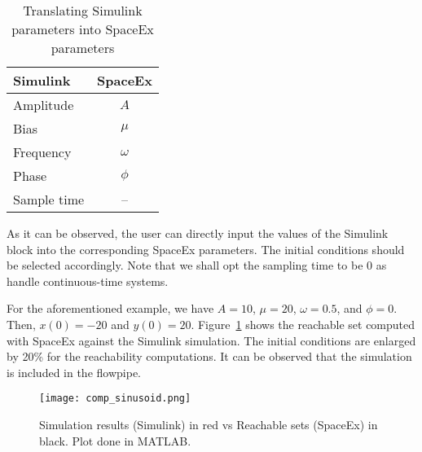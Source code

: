 \documentclass{article}
\begin{document}
\begin{table}[ht!]
\centering
\caption{Translating Simulink parameters into SpaceEx parameters\label{table}}
\begin{tabular}{lc}
 \toprule
 Simulink & SpaceEx \\
 \midrule
 Amplitude & $A$\\
 Bias & $\mu$\\
 Frequency & $\omega$\\
 Phase & $\phi$ \\
 Sample time & --\\
\bottomrule
\end{tabular}
\end{table}
%
As it can be observed, the user can directly input the values of the Simulink block into the corresponding SpaceEx parameters. The initial conditions should be selected accordingly. Note that we shall opt the sampling time to be 0 as handle continuous-time systems. 

\newpage
For the aforementioned example, we have $A=10$, $\mu=20$, $\omega=0.5$, and $\phi=0$. Then, $x(0)=-20$ and $y(0)=20$. Figure~\ref{comparison_sin} shows the reachable set computed with SpaceEx against the Simulink simulation. The initial conditions are enlarged by 20\% for the reachability computations. It can be observed that the simulation is included in the flowpipe.

\begin{figure}[ht!]
\centering
\texttt{[image: comp\_sinusoid.png]}
\caption{Simulation results (Simulink) in red vs Reachable sets (SpaceEx) in black. Plot done in MATLAB.}
\label{comparison_sin}
\end{figure}
\newpage


\end{document}
